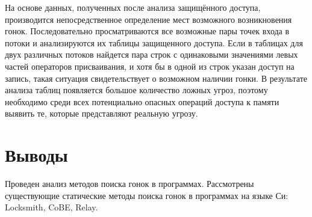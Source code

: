 На основе данных, полученных после анализа защищённого доступа, производится непосредственное определение мест возможного возникновения гонок. Последовательно просматриваются все возможные пары точек входа в потоки и анализируются их таблицы защищенного доступа. Если в таблицах для двух различных потоков найдется пара строк с одинаковыми значениями левых частей операторов присваивания, и хотя бы в одной из строк указан доступ на запись, такая ситуация свидетельствует о возможном наличии гонки. В результате анализа таблиц появляется большое количество ложных угроз, поэтому необходимо среди всех потенциально опасных операций доступа к памяти выявить те, которые представляют реальную угрозу.


\section{Выводы}

Проведен анализ методов поиска гонок в программах. Рассмотрены существующие статические методы поиска гонок в программах на языке Си: Locksmith, CoBE, Relay.

